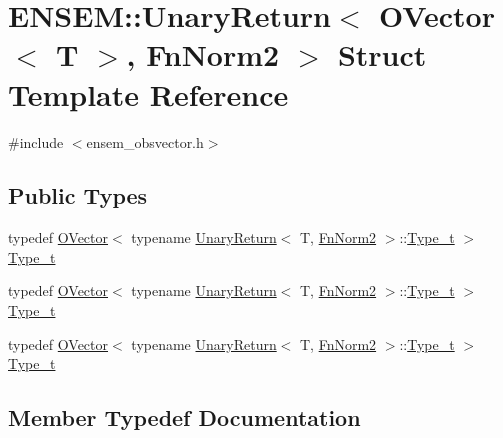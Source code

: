 \hypertarget{structENSEM_1_1UnaryReturn_3_01OVector_3_01T_01_4_00_01FnNorm2_01_4}{}\section{E\+N\+S\+EM\+:\+:Unary\+Return$<$ O\+Vector$<$ T $>$, Fn\+Norm2 $>$ Struct Template Reference}
\label{structENSEM_1_1UnaryReturn_3_01OVector_3_01T_01_4_00_01FnNorm2_01_4}


{\ttfamily \#include $<$ensem\+\_\+obsvector.\+h$>$}

\subsection*{Public Types}
\begin{DoxyCompactItemize}
\item 
typedef \mbox{\hyperlink{classENSEM_1_1OVector}{O\+Vector}}$<$ typename \mbox{\hyperlink{structENSEM_1_1UnaryReturn}{Unary\+Return}}$<$ T, \mbox{\hyperlink{structENSEM_1_1FnNorm2}{Fn\+Norm2}} $>$\+::\mbox{\hyperlink{structENSEM_1_1UnaryReturn_3_01OVector_3_01T_01_4_00_01FnNorm2_01_4_a67bb1e2e118524484dc34c80b8d75046}{Type\+\_\+t}} $>$ \mbox{\hyperlink{structENSEM_1_1UnaryReturn_3_01OVector_3_01T_01_4_00_01FnNorm2_01_4_a67bb1e2e118524484dc34c80b8d75046}{Type\+\_\+t}}
\item 
typedef \mbox{\hyperlink{classENSEM_1_1OVector}{O\+Vector}}$<$ typename \mbox{\hyperlink{structENSEM_1_1UnaryReturn}{Unary\+Return}}$<$ T, \mbox{\hyperlink{structENSEM_1_1FnNorm2}{Fn\+Norm2}} $>$\+::\mbox{\hyperlink{structENSEM_1_1UnaryReturn_3_01OVector_3_01T_01_4_00_01FnNorm2_01_4_a67bb1e2e118524484dc34c80b8d75046}{Type\+\_\+t}} $>$ \mbox{\hyperlink{structENSEM_1_1UnaryReturn_3_01OVector_3_01T_01_4_00_01FnNorm2_01_4_a67bb1e2e118524484dc34c80b8d75046}{Type\+\_\+t}}
\item 
typedef \mbox{\hyperlink{classENSEM_1_1OVector}{O\+Vector}}$<$ typename \mbox{\hyperlink{structENSEM_1_1UnaryReturn}{Unary\+Return}}$<$ T, \mbox{\hyperlink{structENSEM_1_1FnNorm2}{Fn\+Norm2}} $>$\+::\mbox{\hyperlink{structENSEM_1_1UnaryReturn_3_01OVector_3_01T_01_4_00_01FnNorm2_01_4_a67bb1e2e118524484dc34c80b8d75046}{Type\+\_\+t}} $>$ \mbox{\hyperlink{structENSEM_1_1UnaryReturn_3_01OVector_3_01T_01_4_00_01FnNorm2_01_4_a67bb1e2e118524484dc34c80b8d75046}{Type\+\_\+t}}
\end{DoxyCompactItemize}


\subsection{Member Typedef Documentation}
\mbox{\label{structENSEM_1_1UnaryReturn_3_01OVector_3_01T_01_4_00_01FnNorm2_01_4_a67bb1e2e118524484dc34c80b8d75046}} 
